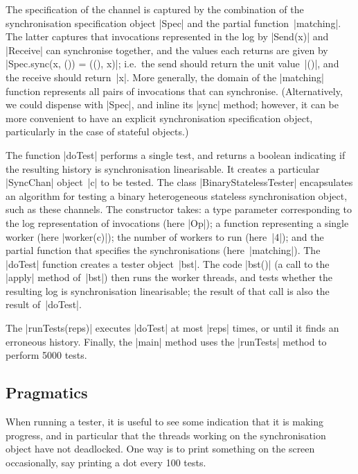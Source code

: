 The specification of the channel is captured by the combination of the
synchronisation specification object |Spec| and the partial
function~|matching|.  The latter captures that invocations represented in the
log by |Send(x)| and |Receive| can synchronise together, and the values each
returns are given by |Spec.sync(x, ()) = ((), x)|; i.e.~the send should return
the unit value~|()|, and the receive should return~|x|.  More generally, the
domain of the |matching| function represents all pairs of invocations that can
synchronise.  (Alternatively, we could dispense with |Spec|, and inline its
|sync| method; however, it can be more convenient to have an explicit
synchronisation specification object, particularly in the case of stateful
objects.)

The function |doTest| performs a single test, and returns a boolean indicating
if the resulting history is synchronisation linearisable.  It creates a
particular |SyncChan| object~|c| to be tested.  The class
|BinaryStatelessTester| encapsulates an algorithm for testing a binary
heterogeneous stateless synchronisation object, such as these channels.  The
constructor takes: a type parameter corresponding to the log representation of
invocations (here |Op|); a function representing a single worker (here
|worker(c)|); the number of workers to run (here~|4|); and the partial
function that specifies the synchronisations (here~|matching|).  The |doTest|
function creates a tester object~|bst|.  The code |bst()| (a call to the
|apply| method of~|bst|) then runs the worker threads, and tests whether the
resulting log is synchronisation linearisable; the result of that call is also
the result of~|doTest|.

The |runTests(reps)| executes |doTest| at most |reps| times, or until it finds
an erroneous history.  Finally, the |main| method uses the |runTests| method
to perform 5000 tests.


\subsection{Pragmatics}

When running a tester, it is useful to see some indication that it is making
progress, and in particular that the threads working on the synchronisation
object have not deadlocked.  One way is to print something on the screen
occasionally, say printing a dot every 100 tests.

